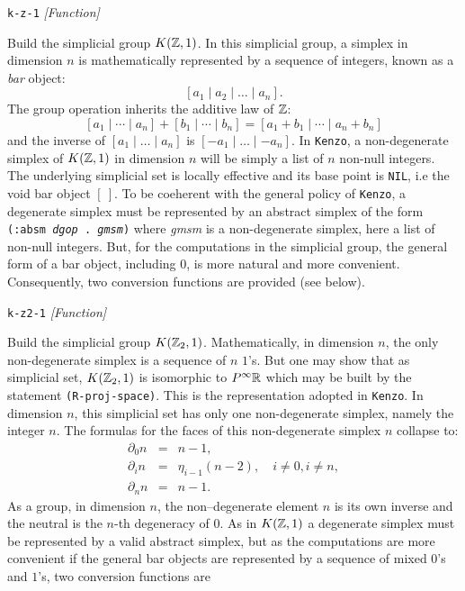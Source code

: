 {\parindent=0mm
{\leftskip=5mm
{\tt k-z-1}  \hfill {\em [Function]} \par}
{\leftskip=15mm
Build the simplicial group $K({{\Bbb Z}},1)$. In this simplicial group, a  simplex  in dimension $n$ 
is mathematically represented by a sequence of integers, known as a {\em bar} object:
$$ [a_1 \mid a_2 \mid \ldots \mid a_n]. $$
The group operation inherits the additive law of ${\Bbb Z}$:
$$[a_1  \mid \cdots \mid a_n] + [b_1 \mid \cdots \mid b_n] = [a_1+b_1 \mid \cdots \mid a_n+b_n]$$
and the inverse of $[a_1  \mid \ldots \mid a_n]$ is $[-a_1 \mid \ldots \mid -a_n]. $
In {\tt Kenzo}, a non-degenerate simplex of $K({{\Bbb Z}},1)$ in dimension $n$ will be simply 
a list of $n$ non-null integers.
The underlying simplicial set is locally effective and its base point is {\tt NIL}, i.e the void bar object
$[\ ]$. To be coeherent with the general policy of {\tt Kenzo}, a degenerate simplex must be represented by
an abstract simplex of the form {\tt (:absm {\em dgop} . {\em gmsm})} where {\em gmsm} is a non-degenerate
simplex, here a list of non-null integers. But, for the computations in the simplicial group, the
general form of a bar object, including $0$, is more natural and more convenient. Consequently, two conversion
functions are provided (see below). \par}
{\leftskip=5mm
{\tt k-z2-1}  \hfill {\em [Function]} \par}
{\leftskip=15mm
Build the simplicial group $K({{\Bbb Z}}_2,1)$. 
Mathematically, in dimension $n$, the only non-degenerate simplex is
a sequence of $n$ $1$'s. But one may show that as simplicial set, $K({{\Bbb Z}}_2,1)$ is  isomorphic to
$P^\infty {{\Bbb R}}$ which may be built by the statement {\tt (R-proj-space)}. This is the representation
adopted in {\tt Kenzo}. In dimension $n$, this
simplicial set has only one non-degenerate simplex, namely the integer $n$. The formulas for the faces of this
non-degenerate simplex $n$ collapse to:
\begin{eqnarray*}
\partial_0 n & = & n-1, \\
\partial_i n & = & \eta_{i-1} (n-2), \quad i \not= 0, i \not=n,  \\
\partial_n n & = & n-1.
\end{eqnarray*} 
As a group, in dimension $n$, the non--degenerate element $n$
is its own inverse and the neutral is the $n$-th degeneracy of $0$. As in $K({{\Bbb Z}}, 1)$ a degenerate simplex
must be represented by a valid abstract simplex, but as the computations are more convenient if the
general bar objects are represented by a sequence of mixed $0$'s and $1$'s, two conversion functions are 
}}
